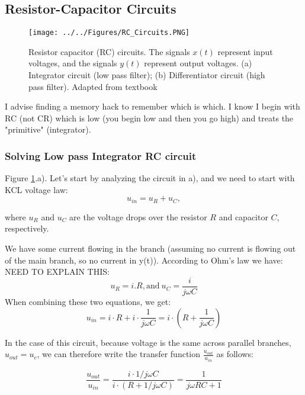 \subsection{Resistor-Capacitor Circuits}\label{sec:resistor_capcitor_circuits}

\begin{figure}[H]
    \centering
    \texttt{[image: ../../Figures/RC\_Circuits.PNG]}
    \caption{Resistor capacitor (RC) circuits. The signals $x(t)$ represent input voltages, and the signals $y(t)$ represent output voltages. (a) Integrator circuit (low pass filter); (b) Differentiator circuit (high pass filter). Adapted from textbook}
    \label{fig:RC_Circuits}
\end{figure}

I advise finding a memory hack to remember which is which. I know I begin with RC (not CR) which is low (you begin low and then you go high) and treats the "primitive" (integrator).   

\subsubsection{Solving Low pass Integrator RC circuit}

Figure \ref{fig:RC_Circuits}.a). Let's start by analyzing the circuit in a), and we need to start with KCL voltage law: 
\begin{equation}
    u_{in} = u_R + u_C, 
\end{equation}

where $u_R$ and $u_C$ are the voltage drops over the resistor $R$ and capacitor $C$, respectively. 

We have some current flowing in the branch (assuming no current is flowing out of the main branch, so no current in y(t)). According to Ohm's law we have: NEED TO EXPLAIN THIS: 
\begin{equation}
    u_R = i.R \mathrm{, and }\ u_C = \frac{i}{j\omega C} 
\end{equation}
When combining these two equations, we get: 
\begin{equation}
    u_{in} = i\cdot R + i\cdot \frac{1}{j \omega C} = i \cdot (R + \frac{1}{j \omega C})
\end{equation}

In the case of this circuit, because voltage is the same across parallel branches, $u_{out} = u_c$, we can therefore write the transfer function $\frac{u_{out}}{u_{in}}$ as follows: 

\begin{equation}
    \frac{u_{out}}{u_{in}} = \frac{i \cdot 1/j \omega C}{i \cdot (R + 1/j \omega C)} = \frac{1}{j \omega RC + 1}
\end{equation}

